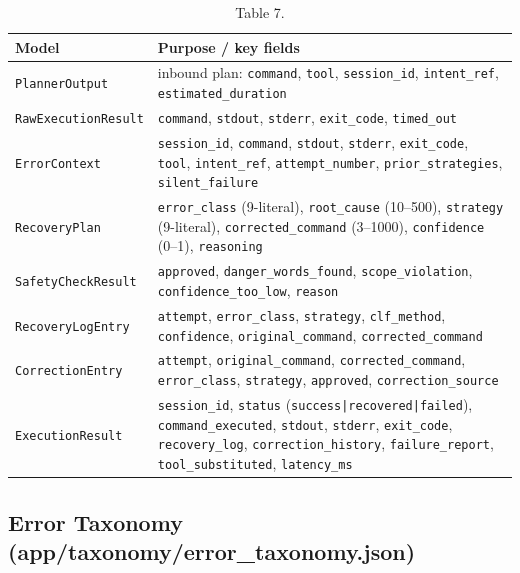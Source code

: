 \documentclass[10pt,journal,onecolumn]{IEEEtran}
\begin{document}
\begin{table}[h]
\caption{Table 7.}
\label{tab:t7}
\begin{tabularx}{\columnwidth}{l >{\raggedright\arraybackslash}X}
\toprule
\textbf{Model} & \textbf{Purpose / key fields}\\
\midrule
\texttt{PlannerOutput} & inbound plan: \texttt{command}, \texttt{tool}, \texttt{session\_id}, \texttt{intent\_ref}, \texttt{estimated\_duration}\\
\texttt{RawExecutionResult} & \texttt{command}, \texttt{stdout}, \texttt{stderr}, \texttt{exit\_code}, \texttt{timed\_out}\\
\texttt{ErrorContext} & \texttt{session\_id}, \texttt{command}, \texttt{stdout}, \texttt{stderr}, \texttt{exit\_code}, \texttt{tool}, \texttt{intent\_ref}, \texttt{attempt\_number}, \texttt{prior\_strategies}, \texttt{silent\_failure}\\
\texttt{RecoveryPlan} & \texttt{error\_class} (9-literal), \texttt{root\_cause} (10--500), \texttt{strategy} (9-literal), \texttt{corrected\_command} (3--1000), \texttt{confidence} (0--1), \texttt{reasoning}\\
\texttt{SafetyCheckResult} & \texttt{approved}, \texttt{danger\_words\_found}, \texttt{scope\_violation}, \texttt{confidence\_too\_low}, \texttt{reason}\\
\texttt{RecoveryLogEntry} & \texttt{attempt}, \texttt{error\_class}, \texttt{strategy}, \texttt{clf\_method}, \texttt{confidence}, \texttt{original\_command}, \texttt{corrected\_command}\\
\texttt{CorrectionEntry} & \texttt{attempt}, \texttt{original\_command}, \texttt{corrected\_command}, \texttt{error\_class}, \texttt{strategy}, \texttt{approved}, \texttt{correction\_source}\\
\texttt{ExecutionResult} & \texttt{session\_id}, \texttt{status} (\texttt{success|recovered|failed}), \texttt{command\_executed}, \texttt{stdout}, \texttt{stderr}, \texttt{exit\_code}, \texttt{recovery\_log}, \texttt{correction\_history}, \texttt{failure\_report}, \texttt{tool\_substituted}, \texttt{latency\_ms}\\
\bottomrule
\end{tabularx}
\end{table}

\subsection{Error Taxonomy (app/taxonomy/error\_taxonomy.json)}
\end{document}
